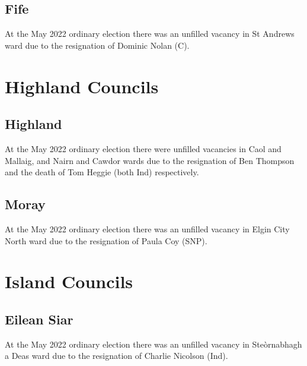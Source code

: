 \documentclass[a4paper,openany]{book}
\begin{document}
\begin{resultsiii}
\subsection*{Fife}

At the May 2022 ordinary election there was an unfilled vacancy in St Andrews ward due to the resignation of Dominic Nolan (C).%

\section{Highland Councils}

\subsection*{Highland}

At the May 2022 ordinary election there were unfilled vacancies in Caol and Mallaig, and Nairn and Cawdor wards due to the resignation of Ben Thompson and the death of Tom Heggie (both Ind) respectively.%
%

\subsection*{Moray}

At the May 2022 ordinary election there was an unfilled vacancy in Elgin City North ward due to the resignation of Paula Coy (SNP).%

\section{Island Councils}

\subsection*{Eilean Siar}

At the May 2022 ordinary election there was an unfilled vacancy in Steòrnabhagh a Deas ward due to the resignation of Charlie Nicolson (Ind).%

\end{resultsiii}

\clearpage
{}
{\scriptsize%
\frenchspacing\printindex}
\thispagestyle{plain}
\end{document}
